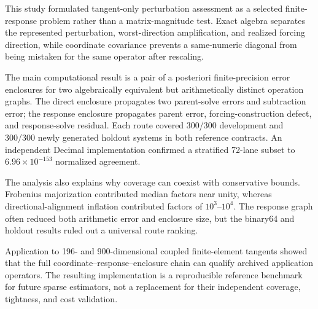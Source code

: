 This study formulated tangent-only perturbation assessment as a selected
finite-response problem rather than a matrix-magnitude test. Exact algebra
separates the represented perturbation, worst-direction amplification, and
realized forcing direction, while coordinate covariance prevents a
same-numeric diagonal from being mistaken for the same operator after
rescaling.

The main computational result is a pair of a posteriori finite-precision error
enclosures for two algebraically equivalent but arithmetically distinct
operation graphs. The direct enclosure propagates two parent-solve errors and
subtraction error; the response enclosure propagates parent error,
forcing-construction defect, and response-solve residual. Each route covered
300/300 development and 300/300 newly generated holdout systems in both
reference contracts. An independent Decimal implementation confirmed a
stratified 72-lane subset to $6.96\times10^{-153}$ normalized agreement.

The analysis also explains why coverage can coexist with conservative bounds.
Frobenius majorization contributed median factors near unity, whereas
directional-alignment inflation contributed factors of $10^3$--$10^4$.
The response graph often reduced both arithmetic error and enclosure size, but
the binary64 and holdout results ruled out a universal route ranking.

Application to 196- and 900-dimensional coupled finite-element tangents showed
that the full coordinate--response--enclosure chain can qualify archived
application operators. The resulting implementation is a reproducible
reference benchmark for future sparse estimators, not a replacement for their
independent coverage, tightness, and cost validation.
